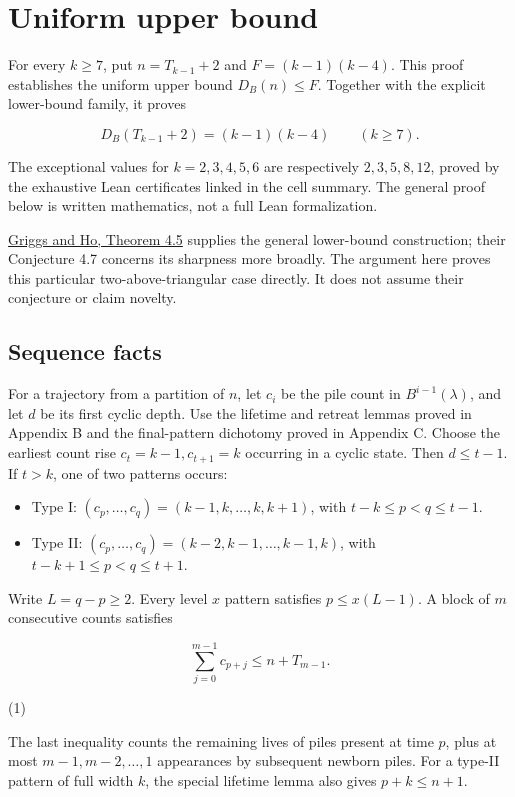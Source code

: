 \documentclass[11pt,a4paper]{article}
\begin{document}
\section{Uniform upper bound}

For every $k\ge7$, put $n=T_{k-1}+2$ and $F=(k-1)(k-4)$. This proof establishes the uniform upper bound $D_B(n)\le F$. Together with the explicit lower-bound family, it proves

\[
D_B(T_{k-1}+2)=(k-1)(k-4)\qquad(k\ge7).
\]

The exceptional values for $k=2,3,4,5,6$ are respectively $2,3,5,8,12$, proved by the exhaustive Lean certificates linked in the cell summary. The general proof below is written mathematics, not a full Lean formalization.

\href{https://sc.edu/study/colleges_schools/artsandsciences/mathematics/research/imi/research/documents/1998/1998_12.pdf}{Griggs and Ho, Theorem 4.5} supplies the general lower-bound construction; their Conjecture 4.7 concerns its sharpness more broadly. The argument here proves this particular two-above-triangular case directly. It does not assume their conjecture or claim novelty.

\subsection{Sequence facts}

For a trajectory from a partition of $n$, let $c_i$ be the pile count in $B^{i-1}(\lambda)$, and let $d$ be its first cyclic depth. Use the lifetime and retreat lemmas proved in Appendix B and the final-pattern dichotomy proved in Appendix C. Choose the earliest count rise $c_t=k-1,c_{t+1}=k$ occurring in a cyclic state. Then $d\le t-1$. If $t>k$, one of two patterns occurs:

\begin{itemize}
\item Type I: $(c_p,\ldots,c_q)=(k-1,k,\ldots,k,k+1)$, with $t-k\le p<q\le t-1$.
\item Type II: $(c_p,\ldots,c_q)=(k-2,k-1,\ldots,k-1,k)$, with $t-k+1\le p<q\le t+1$.
\end{itemize}

Write $L=q-p\ge2$. Every level $x$ pattern satisfies $p\le x(L-1)$. A block of $m$ consecutive counts satisfies

\[
\sum_{j=0}^{m-1}c_{p+j}\le n+T_{m-1}.
\]

(1)

The last inequality counts the remaining lives of piles present at time $p$, plus at most $m-1,m-2,\ldots,1$ appearances by subsequent newborn piles. For a type-II pattern of full width $k$, the special lifetime lemma also gives $p+k\le n+1$.
\end{document}
